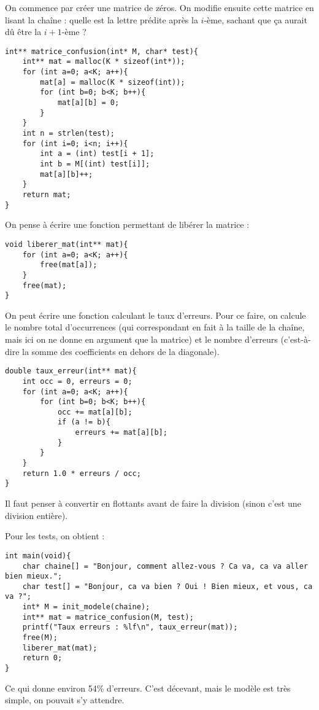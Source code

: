 \documentclass[10pt]{article}
\begin{document}
\begin{Exercise}
On commence par créer une matrice de zéros. On modifie ensuite cette matrice en lisant la chaîne : quelle est la lettre prédite après la $i$-ème, sachant que ça aurait dû être la $i+1$-ème ?
\begin{cbox}
   \begin{verbatim}
int** matrice_confusion(int* M, char* test){
    int** mat = malloc(K * sizeof(int*));
    for (int a=0; a<K; a++){
        mat[a] = malloc(K * sizeof(int));
        for (int b=0; b<K; b++){
            mat[a][b] = 0;
        }
    }
    int n = strlen(test);
    for (int i=0; i<n; i++){
        int a = (int) test[i + 1];
        int b = M[(int) test[i]];
        mat[a][b]++;
    }
    return mat;
}
   \end{verbatim}
\end{cbox}

On pense à écrire une fonction permettant de libérer la matrice :
\begin{cbox}
   \begin{verbatim}
void liberer_mat(int** mat){
    for (int a=0; a<K; a++){
        free(mat[a]);
    }
    free(mat);
}
   \end{verbatim}
\end{cbox}
\end{Exercise}

\begin{Exercise}

On peut écrire une fonction calculant le taux d'erreurs. Pour ce faire, on calcule le nombre total d'occurrences (qui correspondant en fait à la taille de la chaîne, mais ici on ne donne en argument que la matrice) et le nombre d'erreurs (c'est-à-dire la somme des coefficients en dehors de la diagonale).
\begin{cbox}
   \begin{verbatim}
double taux_erreur(int** mat){
    int occ = 0, erreurs = 0;
    for (int a=0; a<K; a++){
        for (int b=0; b<K; b++){
            occ += mat[a][b];
            if (a != b){
                erreurs += mat[a][b];
            }
        }
    }
    return 1.0 * erreurs / occ;
}
   \end{verbatim}
\end{cbox}
Il faut penser à convertir en flottants avant de faire la division (sinon c'est une division entière).

Pour les tests, on obtient :
\begin{cbox}
   \begin{verbatim}
int main(void){
    char chaine[] = "Bonjour, comment allez-vous ? Ca va, ca va aller bien mieux.";
    char test[] = "Bonjour, ca va bien ? Oui ! Bien mieux, et vous, ca va ?";
    int* M = init_modele(chaine);
    int** mat = matrice_confusion(M, test);
    printf("Taux erreurs : %lf\n", taux_erreur(mat));
    free(M);
    liberer_mat(mat);
    return 0;
}
   \end{verbatim}
\end{cbox}
Ce qui donne environ 54\% d'erreurs. C'est décevant, mais le modèle est très simple, on pouvait s'y attendre.
\end{Exercise}
\end{document}

